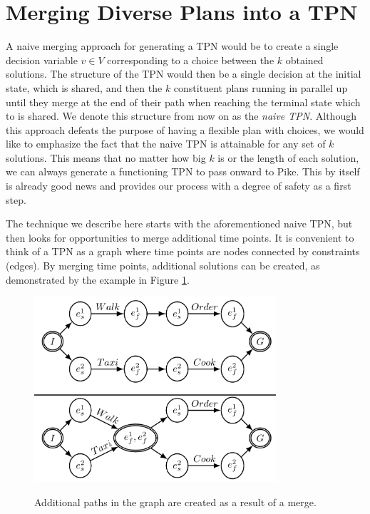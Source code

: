 \section{Merging Diverse Plans into a TPN}
\label{generating: merging}
A naive merging approach for generating a TPN would be to create a single decision variable $v \in V$ corresponding to a choice 
between the $k$ obtained solutions. 
The structure of the TPN would then be a single decision at the
initial state, which is shared, and then the $k$ constituent plans running in parallel
up until they merge at the end of their path when reaching the terminal state which to is shared.
We denote this structure from now on as the \textit{naive TPN}. 
Although this approach defeats the purpose of having a flexible plan with choices, we would like to emphasize 
the fact that the naive TPN is attainable for any set of $k$ solutions. This means that no matter how big $k$ is 
or the length of each solution, we can always generate a functioning TPN to pass onward to Pike.
This by itself is already good news and provides our process with a degree of safety as a first step. 
    
The technique we describe here starts with the aforementioned naive TPN, but then looks for opportunities to merge additional time points.
It is convenient to think of a TPN as a graph where time points are nodes connected by constraints (edges).
By merging time points, additional solutions can be created, as demonstrated by the example in Figure \ref{fig:add_plans_from_merge}.


\begin{figure}
\centering
\includegraphics[width=0.8\textwidth]{graphics/merge.png}
 \label{fig:add_plans_from_merge}
\caption{Additional paths in the graph are created as a result of a merge.} 
\end{figure}

